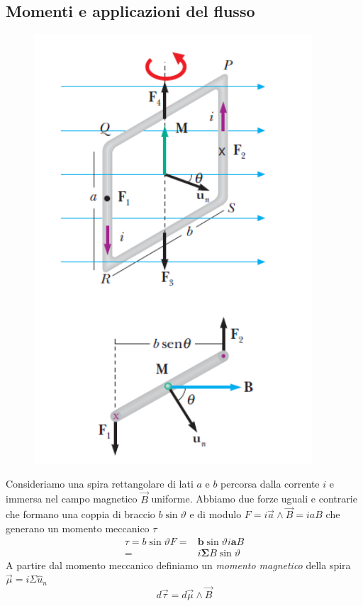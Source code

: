 \documentclass[x11names]{report}
\begin{document}
\subsection{Momenti e applicazioni del flusso}
\begin{figure}
	\vspace{-0.4cm}
	\includegraphics[scale=0.4]{img/spira_1.png}
\end{figure}
Consideriamo una spira rettangolare di lati \(a\) e \(b\) percorsa dalla corrente \(i\) e immersa nel campo magnetico \(\vec{B}\) uniforme. Abbiamo due forze uguali e contrarie che formano una coppia di braccio \(b\sin\vartheta\) e di modulo \(F = i \vec{a}\wedge\vec{B} = i a B\) che generano un momento meccanico \(\tau\)
\begin{align*}
	\tau = b\sin\vartheta F =& \boldsymbol{b}\sin\vartheta i \boldsymbol{a} B \\
	                     =& i\boldsymbol{\Sigma}B\sin\vartheta
\end{align*}
A partire dal momento meccanico definiamo un \textit{momento magnetico} della spira \(\vec{\mu} = i\Sigma\hat{u}_n\) 
\[
d\vec{\tau} = d\vec{\mu}\wedge\vec{B}
\]\\ \\
\end{document}
